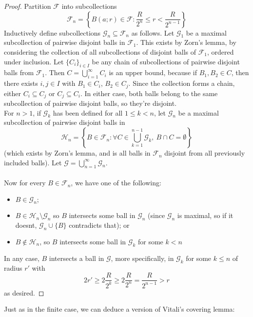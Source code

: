\documentclass{article}
\theoremstyle{plain}
\theoremstyle{definition}
\theoremstyle{remark}
\begin{document}
\begin{proof}
    Partition $\mathcal{F}$ into subcollections
    \[
    \mathcal{F}_n = \left \{B(a;r) \in \mathcal{F}:\frac{R}{2^n} \le r < \frac{R}{2^{n-1}} \right \}
    \]
    Inductively define subcollections $\mathcal{G}_n \subseteq \mathcal{F}_n$ as follows. Let $\mathcal{G}_1$ be a maximal subcollection of pairwise disjoint balls in $\mathcal{F}_1$. This exists by Zorn's lemma, by considering the collection of all subcollections of disjoint balls of $\mathcal{F}_1$, ordered under inclusion. Let $\{C_i\}_{i\in I}$ be any chain of subcollections of pairwise disjoint balls from $\mathcal{F}_1$. Then $C = \bigcup \limits _{i=1} ^ \infty C_i$ is an upper bound, because if $B_1,B_2 \in C$, then there exists $i,j \in I$ with $B_1 \in C_i$, $B_2 \in C_j$. Since the collection forms a chain, either $C_i \subseteq C_j$ or $C_j \subseteq C_i$. In either case, both balls belong to the same subcollection of pairwise disjoint balls, so they're disjoint.  \\ For $n > 1$, if $\mathcal{G}_k$ has been defined for all $1\le k < n$, let $\mathcal{G}_n$ be a maximal subcollection of pairwise disjoint balls in 
    \[
    \mathcal{H}_n = \left \{ B \in \mathcal{F}_n: \forall C \in \bigcup \limits _{k=1}^{n-1} \mathcal{G}_k, \ B \cap C = \emptyset \right \}
    \]
    (which exists by Zorn's lemma, and is all balls in $\mathcal{F}_n$ disjoint from all previously included balls). Let $\mathcal{G} = \bigcup \limits _{n=1} ^\infty \mathcal{G}_n$.
    \\ ~\\ Now for every $B \in \mathcal{F}_n$, we have one of the following:
    \begin{itemize}
        \item $B \in \mathcal{G}_n$;
        \item $B \in \mathcal{H}_n \setminus \mathcal{G}_n$ so $B$ intersects some ball in $\mathcal{G}_n$ (since $\mathcal{G}_n$ is maximal, so if it doesnt, $\mathcal{G}_n \cup \{B\}$ contradicts that); or
        \item $B \notin \mathcal{H}_n$, so $B$ intersects some ball in $\mathcal{G}_k$ for some $k < n$
    \end{itemize}
    In any case, $B$ intersects a ball in $\mathcal{G}$, more specifically, in $\mathcal{G}_k$ for some $k 
    \le n$ of radius $r'$ with
    \[
    2r' \ge 2 \frac{R}{2^k} \ge 2\frac{R}{2^n} = \frac{R}{2^{n-1}} > r
    \]
    as desired.
\end{proof}
Just as in the finite case, we can deduce a version of Vitali's covering lemma:
\end{document}
